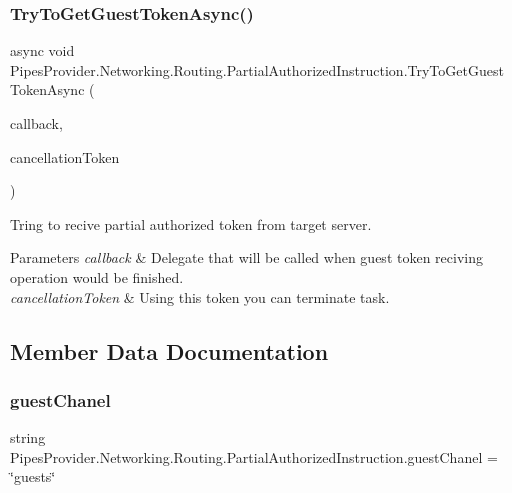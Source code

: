 \subsubsection{\texorpdfstring{Try\+To\+Get\+Guest\+Token\+Async()}{TryToGetGuestTokenAsync()}}
{\footnotesize\ttfamily async void Pipes\+Provider.\+Networking.\+Routing.\+Partial\+Authorized\+Instruction.\+Try\+To\+Get\+Guest\+Token\+Async (\begin{DoxyParamCaption}\item[{System.\+Action$<$ \mbox{\hyperlink{class_pipes_provider_1_1_networking_1_1_routing_1_1_partial_authorized_instruction}{Partial\+Authorized\+Instruction}} $>$}]{callback,  }\item[{Cancellation\+Token}]{cancellation\+Token }\end{DoxyParamCaption})}



Tring to recive partial authorized token from target server. 


\begin{DoxyParams}{Parameters}
{\em callback} & Delegate that will be called when guest token reciving operation would be finished.\\
\hline
{\em cancellation\+Token} & Using this token you can terminate task.\\
\hline
\end{DoxyParams}


\subsection{Member Data Documentation}
\mbox{\label{class_pipes_provider_1_1_networking_1_1_routing_1_1_partial_authorized_instruction_abda0735bb8ca245802008413dd50c863}} 
\subsubsection{\texorpdfstring{guest\+Chanel}{guestChanel}}
{\footnotesize\ttfamily string Pipes\+Provider.\+Networking.\+Routing.\+Partial\+Authorized\+Instruction.\+guest\+Chanel = \char`\"{}guests\char`\"{}}



